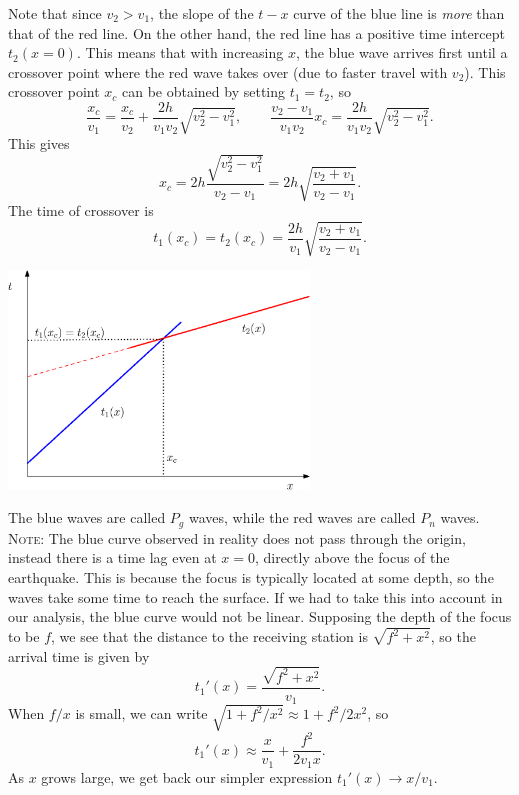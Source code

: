 \documentclass[10pt]{article}
\begin{document}
    Note that since $v_2 > v_1$, the slope of the $t-x$ curve of the blue line is
    \textit{more} than that of the red line. On the other hand, the red line has a
    positive time intercept $t_2(x = 0)$. This means that with increasing $x$, the
    blue wave arrives first until a crossover point where the red wave takes over
    (due to faster travel with $v_2$). This crossover point $x_c$ can be obtained by
    setting $t_1 = t_2$, so \[
        \frac{x_c}{v_1} = \frac{x_c}{v_2} + \frac{2h}{v_1v_2}\sqrt{v_2^2 -
        v_1^2}, \qquad \frac{v_2 - v_1}{v_1v_2}x_c =
        \frac{2h}{v_1v_2}\sqrt{v_2^2 - v_1^2}.
    \] This gives \[
        x_c = 2h\frac{\sqrt{v_2^2 - v_1^2}}{v_2 - v_1} 
                = 2h \sqrt{\frac{v_2 + v_1}{v_2 - v_1}}.
    \] The time of crossover is \[
        t_1(x_c) = t_2(x_c) = 
                \frac{2h}{v_1}\sqrt{\frac{v_2 + v_1}{v_2 - v_1}}.
    \] 
    \begin{center}
        \includegraphics[width=0.6\textwidth]{./T_X.eps}
    \end{center}
    The blue waves are called $P_g$ waves, while the red waves are called $P_n$
    waves. \\

    \textsc{Note}: The blue curve observed in reality does not pass through the
    origin, instead there is a time lag even at $x = 0$, directly above the focus of
    the earthquake.  This is because the focus is typically located at some depth,
    so the waves take some time to reach the surface. If we had to take this into
    account in our analysis, the blue curve would not be linear. Supposing the depth
    of the focus to be $f$, we see that the distance to the receiving station is
    $\sqrt{f^2 + x^2}$, so the arrival time is given by \[
        t_1'(x) = \frac{\sqrt{f^2 + x^2}}{v_1}.
    \] When $f /x$ is small, we can write $\sqrt{1 + f^2/x^2} \approx 1 + f^2
    /2x^2$, so \[
        t_1'(x) \approx \frac{x}{v_1} + \frac{f^2}{2v_1x}.
    \] As $x$ grows large, we get back our simpler expression $t_1'(x) \to x / v_1$.
\end{document}
